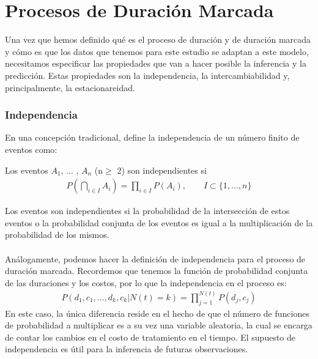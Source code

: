 \section{Procesos de Duraci\'on Marcada}
Una vez que hemos definido qu\'e es el proceso de duraci\'on y de duraci\'on marcada y c\'omo es que los datos que tenemos para este estudio se adaptan a este modelo, necesitamos especificar las propiedades que van a hacer posible la inferencia y la predicci\'on. Estas propiedades son la independencia, la intercambiabilidad y, principalmente, la estacionareidad.
\subsubsection{Independencia}
En una concepci\'on tradicional, \cite{resnickpath} define la independencia de un n\'umero finito de eventos como:\\
\begin{defi}
Los eventos $A_1$, ... , $A_n$ (n$\geq$ 2) son independientes si
\begin{align*}
P(\bigcap_{i \in I} A_i) = \prod_{i \in I} P(A_i), \qquad I \subset\{1,...,n\}
\end{align*}
\end{defi}
Los eventos son independientes si la probabilidad de la intersecci\'on de estos eventos o la probabilidad conjunta de los eventos es igual a la multiplicaci\'on de la probabilidad de los mismos.\\
\\
An\'alogamente, podemos hacer la definici\'on de independencia para el proceso de duraci\'on marcada. Recordemos que tenemos la funci\'on de probabilidad conjunta de las duraciones y los costos, por lo que la independencia en el proceso es:
\begin{align*}
P(d_1,c_1,...,d_k,c_k|N(t)=k)=\prod_{j=1}^{N(t)} P(d_j,c_j)
\end{align*}
En este caso, la \'unica diferencia reside en el hecho de que el n\'umero de funciones de probabilidad a multiplicar es a su vez una variable aleatoria, la cual se encarga de contar los cambios en el costo de tratamiento en el tiempo. El supuesto de independencia es \'util para la inferencia de futuras observaciones.
